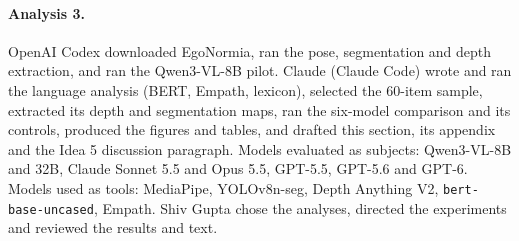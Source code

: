 \paragraph{Analysis 3.} OpenAI Codex downloaded EgoNormia, ran the pose, segmentation and depth extraction, and ran the Qwen3-VL-8B pilot. Claude (Claude Code) wrote and ran the language analysis (BERT, Empath, lexicon), selected the 60-item sample, extracted its depth and segmentation maps, ran the six-model comparison and its controls, produced the figures and tables, and drafted this section, its appendix and the Idea 5 discussion paragraph. Models evaluated as subjects: Qwen3-VL-8B and 32B, Claude Sonnet 5.5 and Opus 5.5, GPT-5.5, GPT-5.6 and GPT-6. Models used as tools: MediaPipe, YOLOv8n-seg, Depth Anything V2, \texttt{bert-base-uncased}, Empath. Shiv Gupta chose the analyses, directed the experiments and reviewed the results and text.
